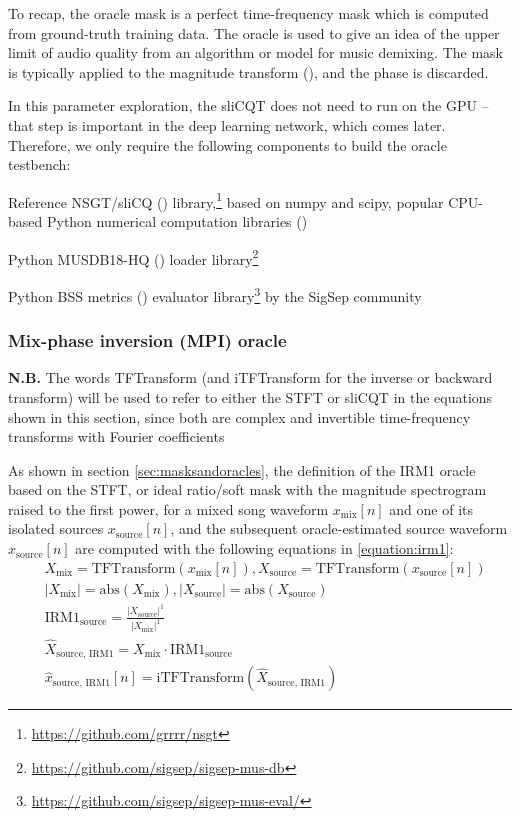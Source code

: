 \documentclass[report.tex]{subfiles}
\begin{document}
To recap, the oracle mask is a perfect time-frequency mask which is computed from ground-truth training data. The oracle is used to give an idea of the upper limit of audio quality from an algorithm or model for music demixing. The mask is typically applied to the magnitude transform (\cite{umx}), and the phase is discarded.

In this parameter exploration, the sliCQT does not need to run on the GPU -- that step is important in the deep learning network, which comes later. Therefore, we only require the following components to build the oracle testbench:

\begin{tight_enumerate}
	\item
		Reference NSGT/sliCQ (\cite{invertiblecqt}) library,\footnote{\url{https://github.com/grrrr/nsgt}} based on numpy and scipy, popular CPU-based Python numerical computation libraries (\cite{numpy, scipy})
	\item
		Python MUSDB18-HQ (\cite{musdb18hq}) loader library\footnote{\url{https://github.com/sigsep/sigsep-mus-db}}
	\item
		Python BSS metrics (\cite{bss}) evaluator library\footnote{\url{https://github.com/sigsep/sigsep-mus-eval/}} by the SigSep community
\end{tight_enumerate}

\subsubsection{Mix-phase inversion (MPI) oracle}

\textbf{N.B.} The words TFTransform (and iTFTransform for the inverse or backward transform) will be used to refer to either the STFT or sliCQT in the equations shown in this section, since both are complex and invertible time-frequency transforms with Fourier coefficients

As shown in section \ref{sec:masksandoracles}, the definition of the IRM1 oracle based on the STFT, or ideal ratio/soft mask with the magnitude spectrogram raised to the first power, for a mixed song waveform $x_{\text{mix}}[n]$ and one of its isolated sources $x_{\text{source}}[n]$, and the subsequent oracle-estimated source waveform $\hat{x}_{\text{source}}[n]$ are computed with the following equations in \ref{equation:irm1}:
\begin{align}\tag{1}\label{equation:irm1}
	\nonumber & X_{\text{mix}} = \text{TFTransform}(x_{\text{mix}}[n]), X_{\text{source}} = \text{TFTransform}(x_{\text{source}}[n])\\
	\nonumber & |X_{\text{mix}}| = \text{abs}(X_{\text{mix}}), |X_{\text{source}}| = \text{abs}(X_{\text{source}})\\
	\nonumber & \text{IRM1}_{\text{source}} = \frac{|X_{\text{source}}|^{1}}{|X_{\text{mix}}|^{1}}\\
	\nonumber & \hat{X}_{\text{source, IRM1}} = X_{\text{mix}} \cdot \text{IRM1}_{\text{source}}\\
	\nonumber & \hat{x}_{\text{source, IRM1}}[n] = \text{iTFTransform}(\hat{X}_{\text{source, IRM1}})
\end{align}
\end{document}
